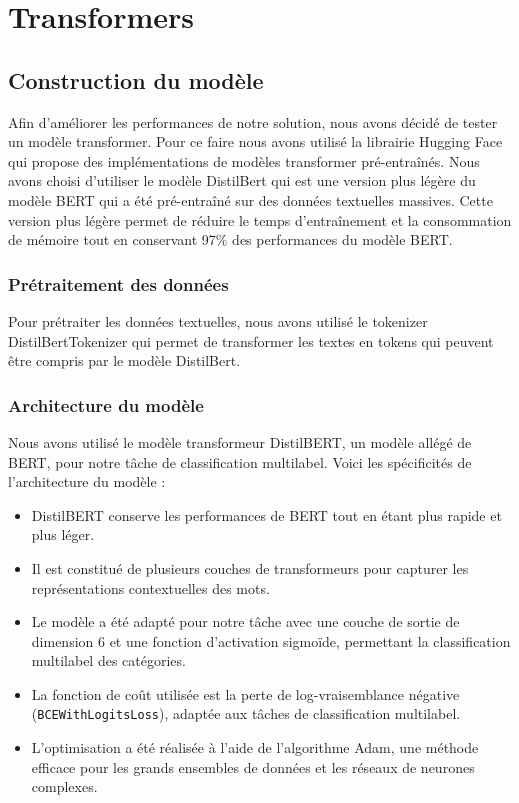 \chapter{Transformers}

\section{Construction du modèle}

Afin d'améliorer les performances de notre solution, nous avons décidé de tester un modèle transformer.
Pour ce faire nous avons utilisé la librairie Hugging Face qui propose des implémentations de modèles transformer pré-entraînés.
Nous avons choisi d'utiliser le modèle DistilBert qui est une version plus légère du modèle BERT qui a été pré-entraîné sur des données textuelles massives.
Cette version plus légère permet de réduire le temps d'entraînement et la consommation de mémoire tout en conservant 97\% des performances du modèle BERT.

\subsection{Prétraitement des données}

Pour prétraiter les données textuelles, nous avons utilisé le tokenizer DistilBertTokenizer qui permet de transformer les textes en tokens qui peuvent être compris par le modèle DistilBert.

\subsection{Architecture du modèle}

Nous avons utilisé le modèle transformeur DistilBERT, un modèle allégé de BERT, pour notre tâche de classification multilabel. Voici les spécificités de l'architecture du modèle :

\begin{itemize}
\item DistilBERT conserve les performances de BERT tout en étant plus rapide et plus léger.
\item Il est constitué de plusieurs couches de transformeurs pour capturer les représentations contextuelles des mots.
\item Le modèle a été adapté pour notre tâche avec une couche de sortie de dimension 6 et une fonction d'activation sigmoïde, permettant la classification multilabel des catégories.
\item La fonction de coût utilisée est la perte de log-vraisemblance négative (\texttt{BCEWithLogitsLoss}), adaptée aux tâches de classification multilabel.
\item L'optimisation a été réalisée à l'aide de l'algorithme Adam, une méthode efficace pour les grands ensembles de données et les réseaux de neurones complexes.
\end{itemize}

